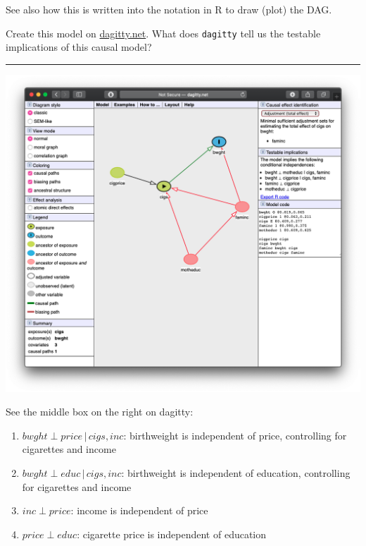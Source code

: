 \documentclass[
]{article}
\begin{document}
See also how this is written into the notation in R to draw (plot) the
DAG.

Create this model on \href{htpp://dagitty.net}{dagitty.net}. What does
\texttt{dagitty} tell us the testable implications of this causal model?

\begin{center}\rule{0.5\linewidth}{0.5pt}\end{center}

\includegraphics{../images/4dagitty.png}

See the middle box on the right on dagitty:

\begin{enumerate}
\def\labelenumi{\arabic{enumi}.}
\item
  \(bwght \perp price \, | \, cigs, inc\): birthweight is independent of
  price, controlling for cigarettes and income
\item
  \(bwght \perp educ \, | \, cigs, inc\): birthweight is independent of
  education, controlling for cigarettes and income
\item
  \(inc \perp price\): income is independent of price
\item
  \(price \perp educ\): cigarette price is independent of education
\end{enumerate}
\end{document}
